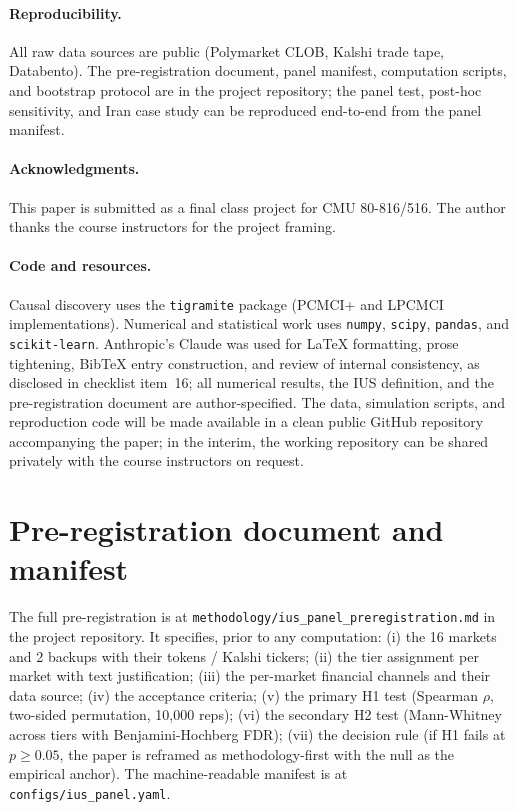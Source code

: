\documentclass{article}
\begin{document}
\paragraph{Reproducibility.}
All raw data sources are public (Polymarket CLOB, Kalshi trade tape, Databento). The pre-registration document, panel manifest, computation scripts, and bootstrap protocol are in the project repository; the panel test, post-hoc sensitivity, and Iran case study can be reproduced end-to-end from the panel manifest.

\paragraph{Acknowledgments.}
This paper is submitted as a final class project for CMU 80-816/516. The author thanks the course instructors for the project framing.

\paragraph{Code and resources.}
Causal discovery uses the \texttt{tigramite} package (PCMCI+ and LPCMCI implementations). Numerical and statistical work uses \texttt{numpy}, \texttt{scipy}, \texttt{pandas}, and \texttt{scikit-learn}. Anthropic's Claude was used for LaTeX formatting, prose tightening, BibTeX entry construction, and review of internal consistency, as disclosed in checklist item~16; all numerical results, the IUS definition, and the pre-registration document are author-specified. The data, simulation scripts, and reproduction code will be made available in a clean public GitHub repository accompanying the paper; in the interim, the working repository can be shared privately with the course instructors on request.




\appendix

\section{Pre-registration document and manifest}
\label{app:prereg}

The full pre-registration is at \texttt{methodology/ius\_panel\_preregistration.md} in the project repository. It specifies, prior to any computation: (i) the 16 markets and 2 backups with their tokens / Kalshi tickers; (ii) the tier assignment per market with text justification; (iii) the per-market financial channels and their data source; (iv) the acceptance criteria; (v) the primary H1 test (Spearman $\rho$, two-sided permutation, 10{,}000 reps); (vi) the secondary H2 test (Mann-Whitney across tiers with Benjamini-Hochberg FDR); (vii) the decision rule (if H1 fails at $p \ge 0.05$, the paper is reframed as methodology-first with the null as the empirical anchor). The machine-readable manifest is at \texttt{configs/ius\_panel.yaml}.
\end{document}
